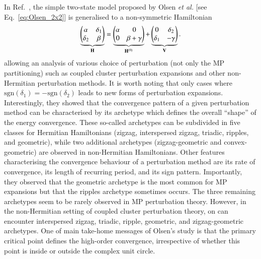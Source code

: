 \documentclass[aps,prb,reprint,noshowkeys,linenumbers,superscriptaddress]{revtex4-1}
\newcommand{\bH}{\mathbf{H}}
\newcommand{\bV}{\mathbf{V}}
\begin{document}
In Ref.~, the simple two-state model proposed by Olsen \textit{et al.} [see Eq.~\eqref{eq:Olsen_2x2}] is generalised to a non-symmetric Hamiltonian 
\begin{equation}
	\underbrace{\mqty(\alpha & \delta_1 \\ \delta_2 & \beta)}_{\bH} = \underbrace{\mqty(\alpha & 0 \\ 0 & \beta + \gamma )}_{\bH^{(0)}} + \underbrace{\mqty( 0 & \delta_2 \\ \delta_1 & - \gamma)}_{\bV}.
\end{equation}
allowing an analysis of various choice of perturbation (not only the MP partitioning) such as coupled cluster perturbation expansions \cite{Pawlowski_2019a,Pawlowski_2019b,Pawlowski_2019c,Pawlowski_2019d,Pawlowski_2019e} and other non-Hermitian perturbation methods.
It is worth noting that only cases where $\text{sgn}(\delta_1) = - \text{sgn}(\delta_2)$ leads to new forms of perturbation expansions.
Interestingly, they showed that the convergence pattern of a given perturbation method can be characterised by its archetype which defines the overall ``shape'' of the energy convergence. 
These so-called archetypes can be subdivided in five classes for Hermitian Hamiltonians (zigzag, interspersed zigzag, triadic, ripples, and geometric), while two additional archetypes (zigzag-geometric and convex-geometric) are observed in non-Hermitian Hamiltonians.
Other features characterising the convergence behaviour of a perturbation method are its rate of convergence, its length of recurring period, and its sign pattern.
Importantly, they observed that the geometric archetype is the most common for MP expansions but that the ripples archetype sometimes occurs. \cite{Handy_1985,Lepetit_1988,Leininger_2000}
The three remaining archetypes seem to be rarely observed in MP perturbation theory.
However, in the non-Hermitian setting of coupled cluster perturbation theory, \cite{Pawlowski_2019a,Pawlowski_2019b,Pawlowski_2019c,Pawlowski_2019d,Pawlowski_2019e} on can encounter interspersed zigzag, triadic, ripple, geometric, and zigzag-geometric archetypes.
One of main take-home messages of Olsen's study is that the primary critical point defines the high-order convergence, irrespective of whether this point is inside or outside the complex unit circle. \cite{Handy_1985,Olsen_2000}

\end{document}
